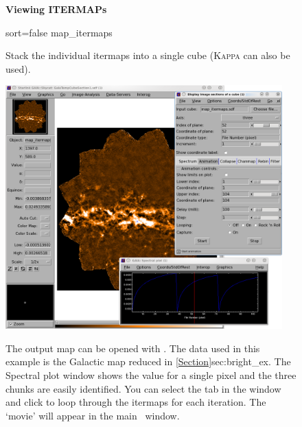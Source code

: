 \begin{figure}[ht!]
\begin{center}
\begin{fmpage}{0.95\linewidth}
\vspace{0.2cm}
\hspace{2mm}
\textbf{Viewing ITERMAPs}
\minipageclear
\vspace{0.5cm}

\begin{minipage}[c]{0.65\linewidth}

\begin{terminalv}
sort=false map_itermaps
\end{terminalv}
\end{minipage}
\hspace{0.3cm}
\begin{minipage}[c]{0.29\linewidth}
Stack the individual itermaps into a single cube (\textsc{Kappa}
 can also be used).
\end{minipage}
\minipageclear

\vspace{0.5cm}

\begin{minipage}[c]{0.65\linewidth}
\centering
\includegraphics[width=0.95\textwidth]{sc21_itermaps_anim}
\end{minipage}
\hspace{0.3cm}
\begin{minipage}[c]{0.29\linewidth}
The output map  can be opened with \gaia. The data used
in this example is the Galactic map reduced in
\cref{Section}{sec:bright_ex}{}. The
Spectral plot window shows the value for a single pixel and the three
chunks are easily identified. You can select the  tab
in the  window and click
 to loop through the itermaps for each iteration.  The
`movie' will appear in the main \gaia\ window.
\end{minipage}
\minipageclear


\end{fmpage}
\end{center}
\end{figure}
